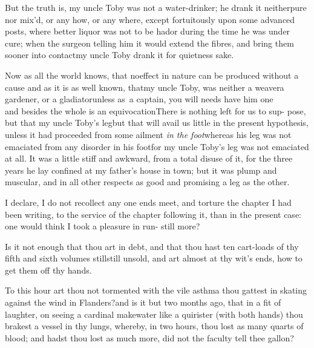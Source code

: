 \documentclass{article}
\begin{document}
But the truth is, my uncle Toby was not a water-drinker;
he drank it neither\break pure nor mix’d, or any how, or any where,
except fortuitously upon some advanced posts, where better liquor
was not to be had\tsh or during the time he was under
cure; when the surgeon telling him it would extend the fibres, and
bring them sooner into contact\tsh my uncle Toby
drank it for quietness sake.

Now as all the world knows, that no\break effect in nature can be
produced without a cause and as it is as well known, that\break my uncle
Toby, was neither a weaver\tsk\break a gardener, or a
gladiator\tsk unless as~a captain, you will needs have him
one\tsk\break
{}\\
and besides the whole is an equivocation\break\tsh There is nothing left for
us to sup- 
pose, but that my uncle Toby’s leg\tsh but that will avail us little in the present
hypothesis, unless it had proceeded from some ailment \textit{in the
foot}\tsk whereas his leg was not emaciated from any disorder
in his foot\tsk for my uncle Toby’s leg was not
emaciated at all. It was a little stiff and awkward, from a total
disuse of it, for the three years he lay confined at my
father’s house in town; but it was plump and muscular, and in
all other respects as good and promising a leg as the other.

I declare, I do not recollect any one\break
{} 
ends meet, and torture the chapter I had been writing, to the
service of the chapter following it, than in the present case:
one would think I took a pleasure in run- 
still more?


Is it not enough that thou art in debt, and that thou hast ten
cart-loads of thy fifth and sixth volumes still\tsk still
unsold, and art almost at thy wit’s ends, how to get them off
thy hands.


To this hour art thou not tormented with the vile asthma
thou gattest in skating against the wind in Flanders?\break and is
it but two months ago, that in a fit of laughter, on seeing a
cardinal make\break water like a quirister (with both hands) thou brakest
a vessel in thy lungs, where\-by, in two hours, thou lost as many
quarts of blood; and hadst thou lost as much more, did not the
faculty tell thee\break
{}
gallon?\tsh
\end{document}
